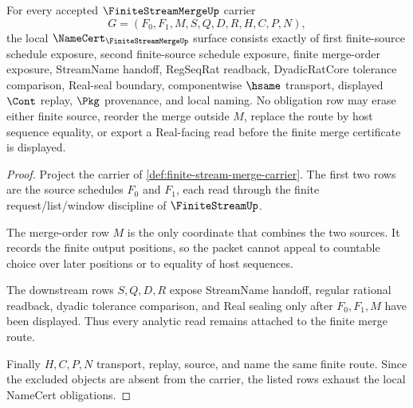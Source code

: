 \begin{theorem}
\label{thm:finite-stream-merge-namecert-obligations}
For every accepted $\FiniteStreamMergeUp$ carrier
$$
G=(F_0,F_1,M,S,Q,D,R,H,C,P,N),
$$
the local $\NameCert_{\FiniteStreamMergeUp}$ surface consists exactly of first finite-source schedule exposure, second finite-source schedule exposure, finite merge-order exposure, StreamName handoff, RegSeqRat readback, DyadicRatCore tolerance comparison, Real-seal boundary, componentwise $\hsame$ transport, displayed $\Cont$ replay, $\Pkg$ provenance, and local naming. No obligation row may erase either finite source, reorder the merge outside $M$, replace the route by host sequence equality, or export a Real-facing read before the finite merge certificate is displayed.
\end{theorem}
\begin{proof}
Project the carrier of \autoref{def:finite-stream-merge-carrier}. The first two rows are the source schedules $F_0$ and $F_1$, each read through the finite request/list/window discipline of $\FiniteStreamUp$.

The merge-order row $M$ is the only coordinate that combines the two sources. It records the finite output positions, so the packet cannot appeal to countable choice over later positions or to equality of host sequences.

The downstream rows $S,Q,D,R$ expose StreamName handoff, regular rational readback, dyadic tolerance comparison, and Real sealing only after $F_0,F_1,M$ have been displayed. Thus every analytic read remains attached to the finite merge route.

Finally $H,C,P,N$ transport, replay, source, and name the same finite route. Since the excluded objects are absent from the carrier, the listed rows exhaust the local NameCert obligations.
\end{proof}

